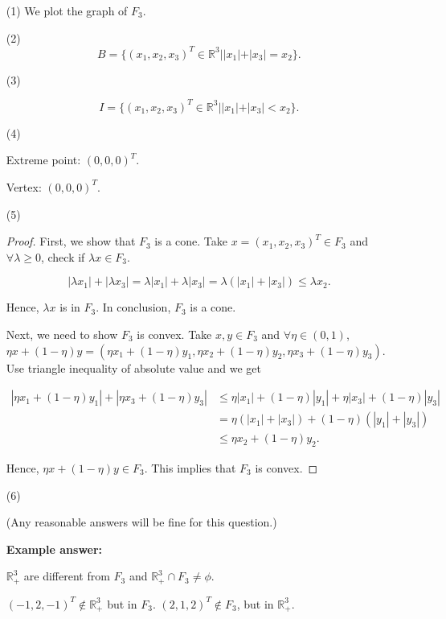 \documentclass[12pt]{article}
\begin{document}
\vspace{50mm}
\begin{enumerate}
\item [(1)]
We plot the graph of $F_3$.


\item [(2)]
$$
B = \{(x_1, x_2, x_3)^T \in \mathbb R^3 | |x_1| + |x_3| = x_2 \}.
$$



\item [(3)]

$$
I = \{(x_1, x_2, x_3)^T \in \mathbb R^3 | |x_1| + |x_3| < x_2 \}.
$$


\item [(4)]

Extreme point: $(0, 0, 0)^T$.

Vertex: $(0, 0, 0)^T$.

\item [(5)]
\begin{proof}

First, we show that $F_3$ is a cone. Take $x = (x_1, x_2, x_3)^T \in F_3$ and $\forall \lambda \geqslant 0$, check if $\lambda x \in F_3$. 

$$
|\lambda x_1| + |\lambda x_3| = \lambda |x_1| + \lambda |x_3| = \lambda (|x_1| + |x_3|) \leqslant \lambda x_2.
$$

Hence, $\lambda x$ is in $F_3$. In conclusion, $F_3$ is a cone.

Next, we need to show $F_3$ is convex. Take $x, y \in F_3$ and $\forall \eta \in (0, 1)$, $\eta x + (1- \eta) y = (\eta x_1 + (1-\eta)y_1, \eta x_2 + (1-\eta)y_2, \eta x_3 + (1-\eta)y_3)$. Use triangle inequality of absolute value and we get

$$
\begin{aligned}
|\eta x_1 + (1-\eta)y_1| + |\eta x_3 + (1-\eta)y_3| & \leqslant \eta |x_1| + (1-\eta)|y_1| + \eta |x_3| + (1-\eta)|y_3| \\
& = \eta (|x_1|+|x_3|) + (1-\eta)(|y_1|+|y_3|) \\
& \leqslant \eta x_2 + (1-\eta) y_2.
\end{aligned}
$$

Hence, $\eta x + (1- \eta) y \in F_3$. This implies that $F_3$ is convex.

\end{proof}

\item [(6)]

(Any reasonable answers will be fine for this question.)

\textbf{Example answer:}

$\mathbb R_+^3$ are different from $F_3$ and $\mathbb R_+^3 \cap F_3 \neq \phi$. 

$(-1, 2, -1)^T \notin \mathbb R_+^3$ but in $F_3$. $(2,1,2)^T \notin F_3$, but in $\mathbb R_+^3$.

\end{enumerate}
\end{document}
